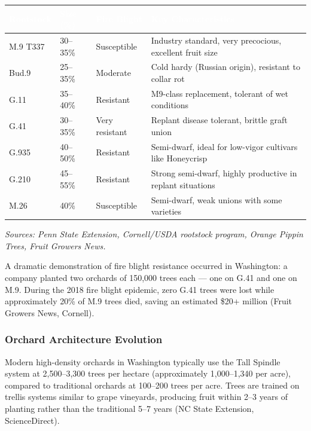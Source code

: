 \documentclass[11pt,letterpaper]{article}
\newcommand{\tableheader}[1]{\textbf{\sffamily\textcolor{white}{#1}}}
\begin{document}
\begin{center}
\begin{tabularx}{\textwidth}{L{2cm}C{2cm}L{2.5cm}X}
\toprule
{}
\tableheader{Rootstock} & \tableheader{Size (\%)} & \tableheader{Fire Blight} & \tableheader{Key Characteristics} \\
\midrule
M.9 T337 & 30--35\% & Susceptible & Industry standard, very precocious, excellent fruit size \\
Bud.9 & 25--35\% & Moderate & Cold hardy (Russian origin), resistant to collar rot \\
G.11 & 35--40\% & Resistant & M9-class replacement, tolerant of wet conditions \\
G.41 & 30--35\% & Very resistant & Replant disease tolerant, brittle graft union \\
G.935 & 40--50\% & Resistant & Semi-dwarf, ideal for low-vigor cultivars like Honeycrisp \\
G.210 & 45--55\% & Resistant & Strong semi-dwarf, highly productive in replant situations \\
M.26 & 40\% & Susceptible & Semi-dwarf, weak unions with some varieties \\
\bottomrule
\end{tabularx}
\end{center}

\textit{Sources: Penn State Extension, Cornell/USDA rootstock program, Orange Pippin Trees, Fruit Growers News.}

A dramatic demonstration of fire blight resistance occurred in Washington: a company planted two orchards of 150,000 trees each --- one on G.41 and one on M.9. During the 2018 fire blight epidemic, zero G.41 trees were lost while approximately 20\% of M.9 trees died, saving an estimated \$20+ million (Fruit Growers News, Cornell).

\subsubsection{Orchard Architecture Evolution}

Modern high-density orchards in Washington typically use the Tall Spindle system at 2,500--3,300 trees per hectare (approximately 1,000--1,340 per acre), compared to traditional orchards at 100--200 trees per acre. Trees are trained on trellis systems similar to grape vineyards, producing fruit within 2--3 years of planting rather than the traditional 5--7 years (NC State Extension, ScienceDirect).
\end{document}
